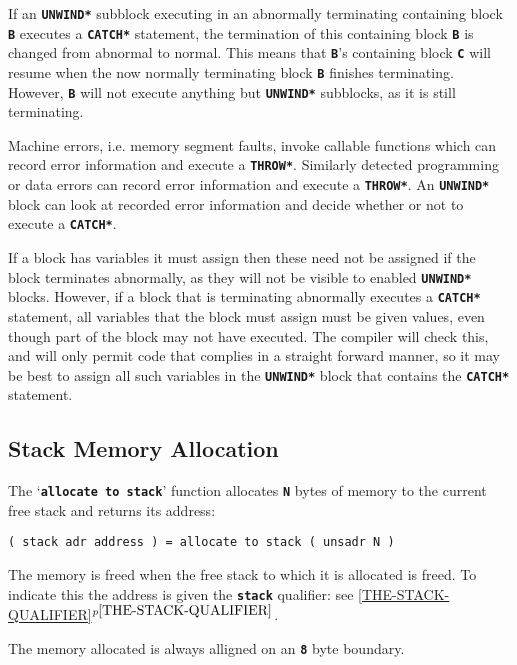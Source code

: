 \documentclass[12pt]{article}
\makeatletter
\newcommand{\TT}[1]{{\tt \bfseries #1}}
\newcommand{\ttkey}[1]{\TT{#1}\index{#1@{\tt #1}}}
\newcommand{\itemref}[1]{\ref{#1}$^{p\pageref{#1}}$}
\newenvironment{indpar}[1][0.3in]%
	{\begin{list}{}%
		     {\setlength{\itemsep}{0in}%
		      \setlength{\topsep}{0in}%
		      \setlength{\parsep}{1ex}%
		      \setlength{\labelwidth}{#1}%
		      \setlength{\leftmargin}{#1}%
		      \addtolength{\leftmargin}{\labelsep}}%
	 \item}%
	{\end{list}}
\makeatother
\begin{document}
If an \TT{*UNWIND*} subblock executing in an abnormally terminating
containing block \TT{B}
executes a \TT{*CATCH*} statement, the termination of this
containing block \TT{B}
is changed from abnormal to normal.  This means
that \TT{B}'s containing block \TT{C} will resume when the now
normally terminating block \TT{B} finishes terminating.
However, \TT{B} will not execute anything but \TT{*UNWIND*}
subblocks, as it is still terminating.

Machine errors, i.e. memory segment faults, invoke callable functions
which can record error information and execute a \TT{*THROW*}.
Similarly detected programming or data errors can record
error information and execute a \TT{*THROW*}.  An \TT{*UNWIND*}
block can look at recorded error information and decide whether
or not to execute a \TT{*CATCH*}.

If a block has variables it must assign then these need not be
assigned if the block terminates abnormally, as they will not
be visible to enabled \TT{*UNWIND*} blocks.  However, if a block
that is terminating abnormally executes a \TT{*CATCH*} statement,
all variables that the block must assign must be given values, even
though part of the block may not have executed.  The compiler
will check this, and will only permit code that complies in a
straight forward manner, so it may be best to assign all such
variables in the \TT{*UNWIND*} block that contains the \TT{*CATCH*}
statement.

\subsection{Stack Memory Allocation}
\label{STACK-MEMORY-ALLOCATION}

The `\ttkey{allocate to stack}' function allocates \TT{N} bytes of
memory to the current free stack and returns its address:

\begin{indpar}\begin{verbatim}
( stack adr address ) = allocate to stack ( unsadr N )
\end{verbatim}\end{indpar}\label{ALLOCATE-TO-STACK}

The memory is freed when the free stack to which it is allocated
is freed.
To indicate this the address is given the \TT{stack} qualifier:
see \itemref{THE-STACK-QUALIFIER}.

The memory allocated is always alligned on an \TT{8} byte boundary.
\end{document}
